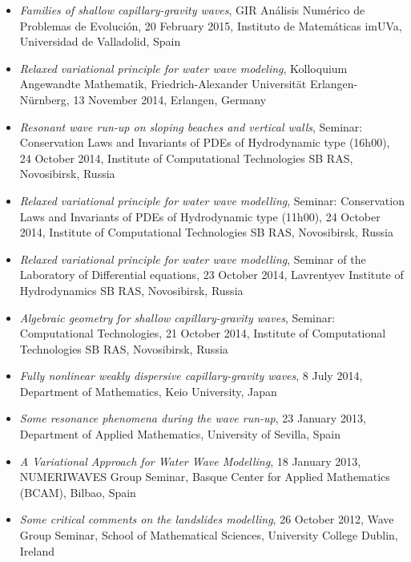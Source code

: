 \documentclass[final, a4paper, oneside, 12pt]{article}
\numberwithin{equation}{section}
\begin{document}
\begin{itemize}
  \item \textit{Families of shallow capillary-gravity waves}, GIR An\'alisis Num\'erico de Problemas de Evoluci\'on, 20 February 2015, Instituto de Matem\'aticas imUVa, Universidad de Valladolid, Spain

  \item \textit{Relaxed variational principle for water wave modeling}, Kolloquium Angewandte Mathematik, Friedrich-Alexander Universit\"at Erlangen-N\"urnberg, 13 November 2014, Erlangen, Germany

  \item \textit{Resonant wave run-up on sloping beaches and vertical walls}, Seminar: Conservation Laws and Invariants of PDEs of Hydrodynamic type (16h00), 24 October 2014, Institute of Computational Technologies SB RAS, Novosibirsk, Russia
  
  \item \textit{Relaxed variational principle for water wave modelling}, Seminar: Conservation Laws and Invariants of PDEs of Hydrodynamic type (11h00), 24 October 2014, Institute of Computational Technologies SB RAS, Novosibirsk, Russia
  
  \item \textit{Relaxed variational principle for water wave modelling}, Seminar of the Laboratory of Differential equations, 23 October 2014, Lavrentyev Institute of Hydrodynamics SB RAS, Novosibirsk, Russia
  
  \item \textit{Algebraic geometry for shallow capillary-gravity waves}, Seminar: Computational Technologies, 21 October 2014, Institute of Computational Technologies SB RAS, Novosibirsk, Russia

  \item \textit{Fully nonlinear weakly dispersive capillary-gravity waves}, 8 July 2014, Department of Mathematics, Keio University, Japan

  \item \textit{Some resonance phenomena during the wave run-up}, 23 January 2013, Department of Applied Mathematics, University of Sevilla, Spain

  \item \textit{A Variational Approach for Water Wave Modelling}, 18 January 2013, NUMERIWAVES Group Seminar, Basque Center for Applied Mathematics (BCAM), Bilbao, Spain

  \item \textit{Some critical comments on the landslides modelling}, 26 October 2012, Wave Group Seminar, School of Mathematical Sciences, University College Dublin, Ireland


\end{itemize}
\end{document}
